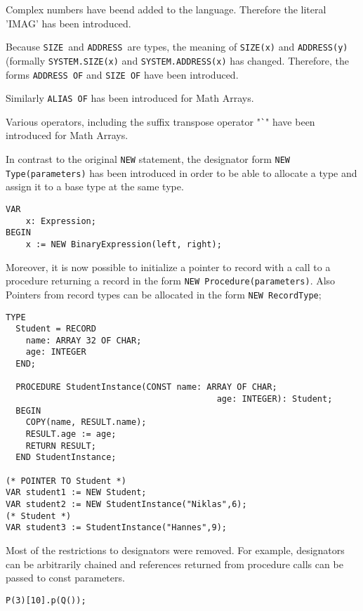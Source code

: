 \documentclass[a4wide,11pt]{article}
\newcommand{\ADDRESS}{\lstinline"ADDRESS"}
\newcommand{\SIZE}{\lstinline"SIZE"}
\begin{document}
\begin{annotation}
Complex numbers have beend added to the language.
Therefore the literal 'IMAG' has been introduced.

Because \SIZE\ and \ADDRESS\ are types, the meaning of \lstinline"SIZE(x)" and \lstinline"ADDRESS(y)" (formally \lstinline"SYSTEM.SIZE(x)" and \lstinline"SYSTEM.ADDRESS(x)" has changed.
Therefore, the forms \lstinline"ADDRESS OF" and \lstinline"SIZE OF" have been introduced.

Similarly \lstinline"ALIAS OF" has been introduced for Math Arrays.

Various operators, including the suffix transpose operator "\lstinline~`~" have been introduced for Math Arrays.


In contrast to the original \lstinline"NEW" statement, the designator form \lstinline"NEW Type(parameters)" has been introduced in order to be able to allocate a type and assign it to a base type at the same type.
\begin{lstlisting}[style=example]
VAR
	x: Expression;
BEGIN
	x := NEW BinaryExpression(left, right);
\end{lstlisting}

Moreover, it is now possible to initialize a pointer to record with a call to a procedure returning a record in the form \lstinline"NEW Procedure(parameters)". Also Pointers from record types can be allocated in the form \lstinline"NEW RecordType";

\begin{lstlisting}[style=example]
TYPE
  Student = RECORD
    name: ARRAY 32 OF CHAR;
    age: INTEGER
  END;

  PROCEDURE StudentInstance(CONST name: ARRAY OF CHAR; 
                                          age: INTEGER): Student;
  BEGIN
    COPY(name, RESULT.name);
    RESULT.age := age;
    RETURN RESULT;
  END StudentInstance;
  
(* POINTER TO Student *)
VAR student1 := NEW Student;
VAR student2 := NEW StudentInstance("Niklas",6);
(* Student *)
VAR student3 := StudentInstance("Hannes",9);
\end{lstlisting}

Most of the restrictions to designators were removed.
For example, designators can be arbitrarily chained and references returned from procedure calls can be passed to const parameters.

\begin{lstlisting}[style=example, caption=Example of a syntactially valid designator]
	P(3)[10].p(Q());
\end{lstlisting}

\end{annotation}
\end{document}
